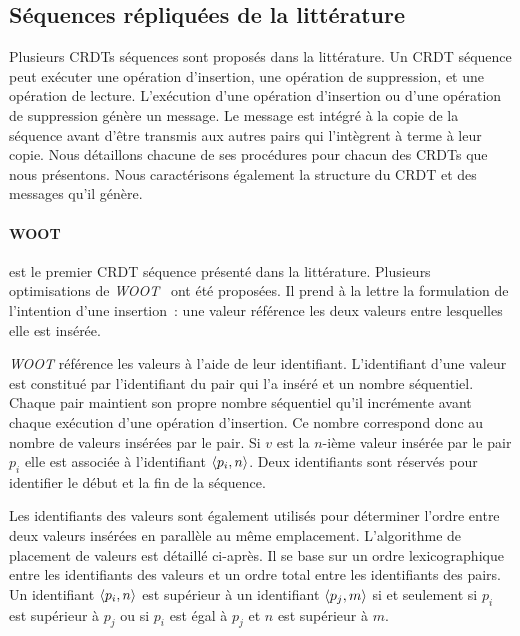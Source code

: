 \subsection{Séquences répliquées de la littérature}

Plusieurs \acp{CRDT} séquences sont proposés dans la littérature.
Un \ac{CRDT} séquence peut exécuter une opération d'insertion, une opération de suppression, et une opération de lecture.
L'exécution d'une opération d'insertion ou d'une opération de suppression génère un message.
Le message est intégré à la copie de la séquence avant d'être transmis aux autres pairs qui l'intègrent à terme à leur copie.
Nous détaillons chacune de ses procédures pour chacun des \acp{CRDT} que nous présentons.
Nous caractérisons également la structure du \ac{CRDT} et des messages qu'il génère.

\paragraph{WOOT}\autocite{oster_2006_woot} est le premier \ac{CRDT} séquence présenté dans la littérature.
Plusieurs optimisations de \emph{WOOT}~\autocite{weiss2007wooki,ahmednacer2011evaluatingcrdts} ont été proposées.
Il prend à la lettre la formulation de l'intention d'une insertion~: une valeur référence les deux valeurs entre lesquelles elle est insérée.

\emph{WOOT} référence les valeurs à l'aide de leur identifiant.
L'identifiant d'une valeur est constitué par l'identifiant du pair qui l'a inséré et un nombre séquentiel.
Chaque pair maintient son propre nombre séquentiel qu'il incrémente avant chaque exécution d'une opération d'insertion.
Ce nombre correspond donc au nombre de valeurs insérées par le pair.
Si $v$ est la $n$-ième valeur insérée par le pair $p_i$ elle est associée à l'identifiant $\tuple*{p_i, n}$.
Deux identifiants sont réservés pour identifier le début et la fin de la séquence.

Les identifiants des valeurs sont également utilisés pour déterminer l'ordre entre deux valeurs insérées en parallèle au même emplacement.
L'algorithme de placement de valeurs est détaillé ci-après.
Il se base sur un ordre lexicographique entre les identifiants des valeurs et un ordre total entre les identifiants des pairs.
Un identifiant $\tuple*{p_i, n}$ est supérieur à un identifiant $\tuple*{p_j, m}$ si et seulement si $p_i$ est supérieur à $p_j$ ou si $p_i$ est égal à $p_j$ et $n$ est supérieur à $m$.

